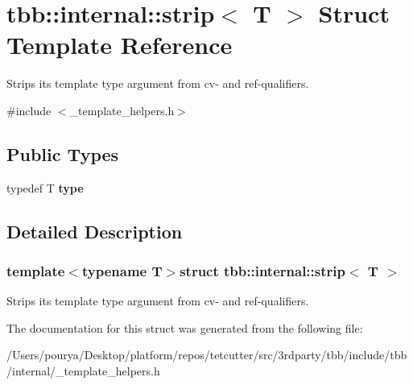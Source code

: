 \hypertarget{structtbb_1_1internal_1_1strip}{}\section{tbb\+:\+:internal\+:\+:strip$<$ T $>$ Struct Template Reference}
\label{structtbb_1_1internal_1_1strip}


Strips its template type argument from cv-\/ and ref-\/qualifiers.  




{\ttfamily \#include $<$\+\_\+template\+\_\+helpers.\+h$>$}

\subsection*{Public Types}
\begin{DoxyCompactItemize}
\item 
\hypertarget{structtbb_1_1internal_1_1strip_a6c6ee143e77dcf7410fb79fff72a1a68}{}typedef T {\bfseries type}\label{structtbb_1_1internal_1_1strip_a6c6ee143e77dcf7410fb79fff72a1a68}

\end{DoxyCompactItemize}


\subsection{Detailed Description}
\subsubsection*{template$<$typename T$>$struct tbb\+::internal\+::strip$<$ T $>$}

Strips its template type argument from cv-\/ and ref-\/qualifiers. 

The documentation for this struct was generated from the following file\+:\begin{DoxyCompactItemize}
\item 
/\+Users/pourya/\+Desktop/platform/repos/tetcutter/src/3rdparty/tbb/include/tbb/internal/\+\_\+template\+\_\+helpers.\+h\end{DoxyCompactItemize}
